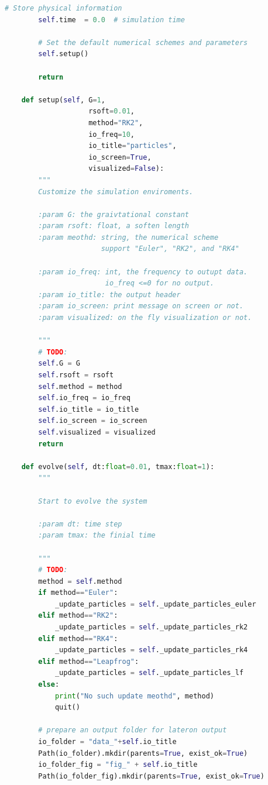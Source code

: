 \documentclass[12pt]{article}
\begin{document}
\begin{lstlisting}[language={Python}]
        # Store physical information
        self.time  = 0.0  # simulation time

        # Set the default numerical schemes and parameters
        self.setup()
        
        return

    def setup(self, G=1, 
                    rsoft=0.01, 
                    method="RK2", 
                    io_freq=10, 
                    io_title="particles",
                    io_screen=True,
                    visualized=False):
        """
        Customize the simulation enviroments.

        :param G: the graivtational constant
        :param rsoft: float, a soften length
        :param meothd: string, the numerical scheme
                       support "Euler", "RK2", and "RK4"

        :param io_freq: int, the frequency to outupt data.
                        io_freq <=0 for no output. 
        :param io_title: the output header
        :param io_screen: print message on screen or not.
        :param visualized: on the fly visualization or not. 
        
        """
        # TODO:
        self.G = G
        self.rsoft = rsoft
        self.method = method
        self.io_freq = io_freq
        self.io_title = io_title
        self.io_screen = io_screen
        self.visualized = visualized
        return

    def evolve(self, dt:float=0.01, tmax:float=1):
        """

        Start to evolve the system

        :param dt: time step
        :param tmax: the finial time
        
        """
        # TODO:
        method = self.method
        if method=="Euler":
            _update_particles = self._update_particles_euler
        elif method=="RK2":
            _update_particles = self._update_particles_rk2
        elif method=="RK4":
            _update_particles = self._update_particles_rk4   
        elif method=="Leapfrog":
            _update_particles = self._update_particles_lf
        else:
            print("No such update meothd", method)
            quit() 

        # prepare an output folder for lateron output
        io_folder = "data_"+self.io_title
        Path(io_folder).mkdir(parents=True, exist_ok=True)
        io_folder_fig = "fig_" + self.io_title
        Path(io_folder_fig).mkdir(parents=True, exist_ok=True)
        

\end{lstlisting}
\end{document}
